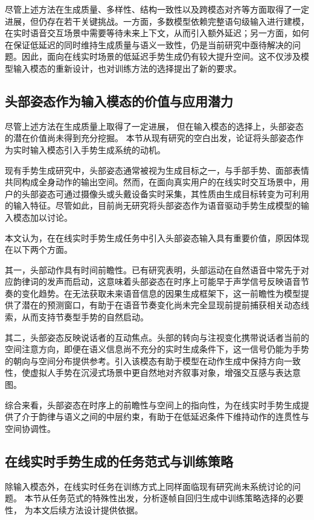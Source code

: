 尽管上述方法在生成质量、多样性、结构一致性以及跨模态对齐等方面取得了一定进展，但仍存在若干关键挑战。一方面，多数模型依赖完整语句级输入进行建模，在实时语音交互场景中需要等待未来上下文，从而引入额外延迟；另一方面，如何在保证低延迟的同时维持生成质量与语义一致性，仍是当前研究中亟待解决的问题。因此，面向在线实时场景的低延迟手势生成仍有较大提升空间。这不仅涉及模型输入模态的重新设计，也对训练方法的选择提出了新的要求。

\subsection{头部姿态作为输入模态的价值与应用潜力}

尽管上述方法在生成质量上取得了一定进展，
但在输入模态的选择上，头部姿态的潜在价值尚未得到充分挖掘。
本节从现有研究的空白出发，论证将头部姿态作为实时输入模态引入手势生成系统的动机。

现有手势生成研究中，头部姿态通常被视为生成目标之一，与手部手势、面部表情共同构成全身动作的输出空间。然而，在面向真实用户的在线实时交互场景中，用户的头部姿态可通过摄像头或头戴设备实时采集，其性质由生成目标转变为可利用的输入特征。尽管如此，目前尚无研究将头部姿态作为语音驱动手势生成模型的输入模态加以讨论。

本文认为，在在线实时手势生成任务中引入头部姿态输入具有重要价值，原因体现在以下两个方面。

其一，头部动作具有时间前瞻性。已有研究表明，头部运动在自然语音中常先于对应韵律词的发声而启动\cite{esteve2017timing}，这意味着头部姿态在时序上可能早于声学信号反映语音节奏的变化趋势。在无法获取未来语音信息的因果生成框架下，这一前瞻性为模型提供了潜在的预测窗口，有助于在语音节奏变化尚未完全显现前提前捕获相关动态线索，从而支持节奏型手势的自然启动。

其二，头部姿态反映说话者的互动焦点。头部的转向与注视变化携带说话者当前的空间注意方向，即便在语义信息尚不充分的实时生成条件下，这一信号仍能为手势的朝向与空间分布提供参考。引入该模态有助于模型在动作生成中保持方向一致性，使虚拟人手势在沉浸式场景中更自然地对齐叙事对象，增强交互感与表达意图。

综合来看，头部姿态在时序上的前瞻性与空间上的指向性，为在线实时手势生成提供了介于韵律与语义之间的中层约束，有助于在低延迟条件下维持动作的连贯性与空间协调性。

\subsection{在线实时手势生成的任务范式与训练策略}

除输入模态外，在线实时任务在训练方式上同样面临现有研究尚未系统讨论的问题。
本节从任务范式的特殊性出发，分析逐帧自回归生成中训练策略选择的必要性，
为本文后续方法设计提供依据。

